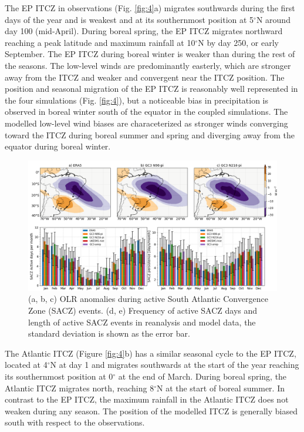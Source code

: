 The EP ITCZ in observations (Fig. \ref{fig:4}a) migrates southwards during the first days of the year and is weakest and at its southernmost position at 5$^\circ$N around day 100 (mid-April).  
During boreal spring, the EP ITCZ migrates northward reaching a peak latitude and maximum rainfall at 10$^\circ$N by day 250, or early September. The EP ITCZ during boreal winter is weaker than during the rest of the seasons.
The low-level winds are predominantly easterly, which are stronger away from the ITCZ and weaker and convergent near the ITCZ position.
The position and seasonal migration of the EP ITCZ is reasonably well represented in the four simulations (Fig. \ref{fig:4}), but a noticeable bias in precipitation is observed in  boreal winter south of the equator in the coupled simulations. The modelled  low-level wind biases are characeterized as stronger winds converging toward the ITCZ during boreal summer and spring and diverging away from the equator during boreal winter. 

\begin{figure}[b!]
\includegraphics[width=\linewidth]{figures/saczanalysis.png}
\caption[SACZ assessment in UKESM1 and HadGEM3]{(a, b, c) OLR anomalies during active South Atlantic Convergence Zone (SACZ) events. (d, e) Frequency of active SACZ days and length of active SACZ events in reanalysis and model data, the standard deviation is shown as the error bar. }
\label{fig:sacz}
\end{figure}

The Atlantic ITCZ (Figure \ref{fig:4}b) has a similar seasonal cycle to the EP ITCZ, located at 4$^\circ$N at day 1 and migrates southwards at the start of the year reaching  its southernmost position at 0$^\circ$ at the end of March.
During boreal spring, the Atlantic ITCZ migrates north, reaching 8$^\circ$N at the start of boreal summer. In contrast to the EP ITCZ, the maximum rainfall in the Atlantic ITCZ does not weaken during any season. 
The position of the modelled ITCZ is generally biased south with respect to the observations.


